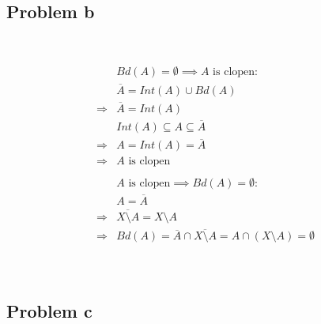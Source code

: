 \documentclass{article}
\begin{document}
~

\subsection*{Problem b}

~

\begin{equation*}
    \begin{split}
        &Bd(A)=\emptyset\implies A\text{ is clopen}:\\
        &\overline{A}=Int(A)\cup Bd(A)\\
        \Rightarrow&\overline{A}=Int(A)\\
        &Int(A)\subseteq A\subseteq\overline{A}\\
        \Rightarrow&A=Int(A)=\overline{A}\\
        \Rightarrow&A\text{ is clopen}\\
        &\\
        &A\text{ is clopen}\implies Bd(A)=\emptyset:\\
        &A=\overline{A}\\
        \Rightarrow&\overline{X\setminus A}=X\setminus A\\
        \Rightarrow&Bd(A)=\overline{A}\cap\overline{X\setminus A}=A\cap(X\setminus A)=\emptyset\\
    \end{split}
\end{equation*}

~

\subsection{Problem c}

~
\end{document}
